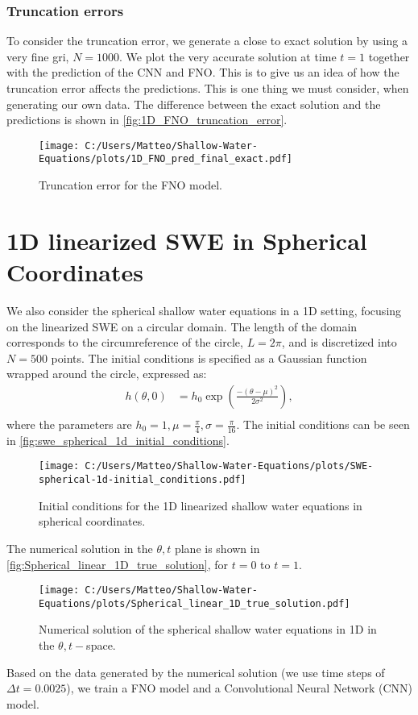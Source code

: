 \subsubsection*{Truncation errors}
To consider the truncation error, we generate a close to exact solution by using a very fine gri, $N = 1000$.
We plot the very accurate solution at time $t = 1$ together with the prediction of the CNN and FNO.
This is to give us an idea of how the truncation error affects the predictions.
This is one thing we must consider, when generating our own data.
The difference between the exact solution and the predictions is shown in \autoref{fig:1D_FNO_truncation_error}.
\begin{figure}[H]
    \centering
    \texttt{[image: C:/Users/Matteo/Shallow-Water-Equations/plots/1D\_FNO\_pred\_final\_exact.pdf]}
    \caption{Truncation error for the FNO model.}\label{fig:1D_FNO_truncation_error}
\end{figure}



\section{1D linearized SWE in Spherical Coordinates}
We also consider the spherical shallow water equations in a 1D setting, focusing on the linearized SWE on a circular domain.
The length of the domain corresponds to the circumreference of the circle, $L = 2\pi$, and is discretized into $N = 500$ points.
The initial conditions is specified as a Gaussian function wrapped around the circle, expressed as:
\begin{align*}
    h(\theta, 0) &= h_0 \exp \left( \frac{-{(\theta-\mu)}^2}{2 \sigma^2} \right) ,\\
\end{align*}
where the parameters are $h_0 = 1, \mu = \frac{\pi}{4}, \sigma = \frac{\pi}{16}$.
The initial conditions can be seen in \autoref{fig:swe_spherical_1d_initial_conditions}.
\begin{figure}[H]
    \centering
    \texttt{[image: C:/Users/Matteo/Shallow-Water-Equations/plots/SWE-spherical-1d-initial\_conditions.pdf]}
    \caption{Initial conditions for the 1D linearized shallow water equations in spherical coordinates.}\label{fig:swe_spherical_1d_initial_conditions}
\end{figure}
The numerical solution in the $\theta,t$ plane is shown in \autoref{fig:Spherical_linear_1D_true_solution}, for $t=0$ to $t=1$.
\begin{figure}[H]
    \centering
    \texttt{[image: C:/Users/Matteo/Shallow-Water-Equations/plots/Spherical\_linear\_1D\_true\_solution.pdf]}
    \caption{Numerical solution of the spherical shallow water equations in 1D in the $\theta,t-$space.}\label{fig:Spherical_linear_1D_true_solution}
\end{figure}
Based on the data generated by the numerical solution (we use time steps of $\Delta t = 0.0025$), we train a FNO model and a Convolutional Neural Network (CNN) model.


